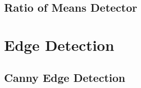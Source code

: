 








\subsection{Ratio of Means Detector }




\section{Edge Detection}

\subsection{Canny Edge Detection}
\ifitkFullVersion

\fi







